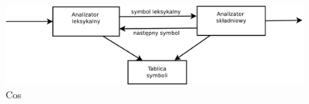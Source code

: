 \documentclass[a4paper,11pt]{article}
\begin{document}
\begin{figure}[!htb]
	\centerline{\includegraphics[scale=0.4]{Diagram1.pdf}}
	\caption{Cos}
	\label{fig:ukladPrzekaznikowy}
\end{figure}
\end{document}
